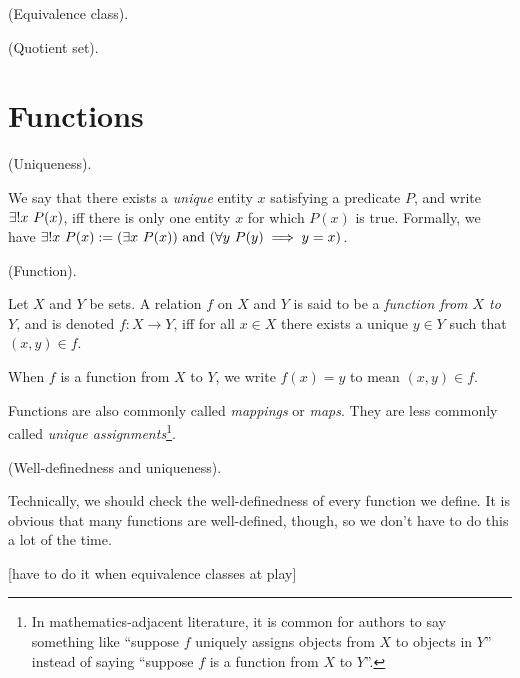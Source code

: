 \begin{defn}
    (Equivalence class).
\end{defn}

\begin{defn}
\label{ch::logic_pf_fns::defn::quotient_set}

    (Quotient set).
\end{defn}

\section*{Functions}

\begin{defn}
    (Uniqueness).

    We say that there exists a \textit{unique} entity $x$ satisfying a predicate $P$, and write $\exists !x \text{ } P(x)$, iff there is only one entity $x$ for which $P(x)$ is true. Formally, we have ${\exists !x \text{ } P(x) := (\exists x \text{ } P(x)) \text{ and } (\forall y \text{ } P(y) \implies y = x)}$.
\end{defn}

\begin{defn}
    (Function).

    Let $X$ and $Y$ be sets. A relation $f$ on $X$ and $Y$ is said to be a \textit{function from $X$ to $Y$}, and is denoted $f:X \rightarrow Y$, iff for all $x \in X$ there exists a unique $y \in Y$ such that $(x, y) \in f$.

    When $f$ is a function from $X$ to $Y$, we write $f(x) = y$ to mean $(x, y) \in f$.
    
    Functions are also commonly called \textit{mappings} or \textit{maps}. They are less commonly called \textit{unique assignments}\footnote{In mathematics-adjacent literature, it is common for authors to say something like ``suppose $f$ uniquely assigns objects from $X$ to objects in $Y$'' instead of saying ``suppose $f$ is a function from $X$ to $Y$''.}.
\end{defn}

\begin{remark}
    (Well-definedness and uniqueness).
    
    Technically, we should check the well-definedness of every function we define. It is obvious that many functions are well-defined, though, so we don't have to do this a lot of the time.

    [have to do it when equivalence classes at play]
\end{remark}

